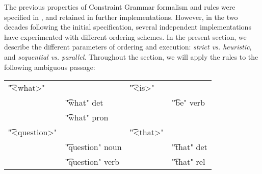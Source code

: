 The previous properties of Constraint Grammar formalism and rules were specified in \cite{karlsson1995constraint}, and retained in further implementations. 
However, in the two decades following the initial specification, 
several independent implementations have experimented with different ordering
schemes. In the present section, we describe the different parameters of ordering and execution: \emph{strict vs. heuristic}, and \emph{sequential vs. parallel}.
%
%
%
Throughout the section, we will apply the rules to the following ambiguous passage:

\begin{tabular}{p{0.6cm} l  p{0.6cm} l}
\t{"<what>"}     &                      &  \t{"<is>"}           & \\
                 & \t{"what" det}       & &      \t{"be" verb}    \\
                 & \t{"what" pron}      &                       & \\
\t{"<question>"} &                      & \t{"<that>"}         & \\
                 & \t{"question" noun}  & &      \t{"that" det}   \\
                 & \t{"question" verb}  & &      \t{"that" rel}
\end{tabular}

